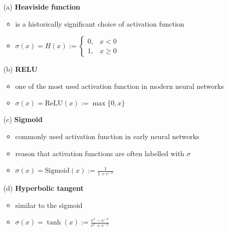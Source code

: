 \begin{enumerate}
    \item[(a)] \textbf{Heaviside function}
    \begin{itemize}
        \item is a historically significant choice of activation function
        \item $\sigma(x) = H(x) :=
            \begin{cases} 
              0, & x < 0 \\
              1, & x \geq 0
            \end{cases}$
    \end{itemize}
    \item [(b)] \textbf{\ac{RELU}}
    \begin{itemize}
        \item one of the most used activation function in modern neural networks
        \item $\sigma(x)=\text{ReLU}(x):=\max\{0,x\}$
    \end{itemize}
    \item [(c)] \textbf{Sigmoid}
    \begin{itemize}
        \item commonly used activation function in early neural networks
        \item reason that activation functions are often labelled with $\sigma$
        \item $\sigma(x)=\text{Sigmoid}(x):=\frac{1}{1+e^{-x}}$
    \end{itemize}
    \item [(d)] \textbf{Hyperbolic tangent}
    \begin{itemize}
        \item similar to the sigmoid 
        \item $\sigma(x) = \tanh(x):=\frac{e^x-e^{-x}}{e^x+e^{-x}}$
    \end{itemize}
\end{enumerate}
